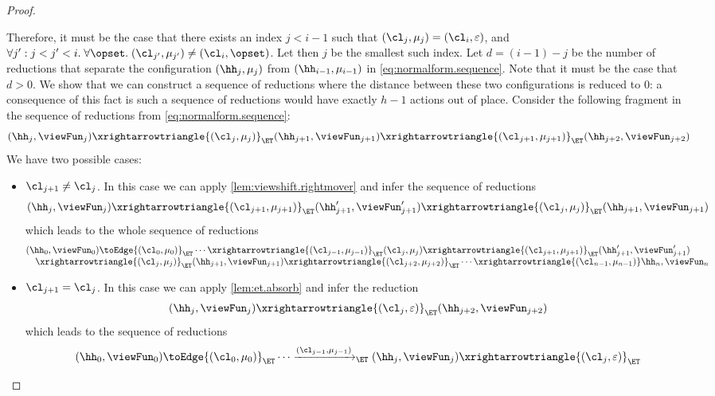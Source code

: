\begin{proof}
\begin{enumerate}
Therefore, it must be the case that there exists an index $j < i-1$ such that $(\cl_{j}, \mu_{j}) = (\cl_{i}, \varepsilon)$, 
and $\forall j': j< j' < i.\;\forall \opset.\;(\cl_{j'}, \mu_{j'}) \neq (\cl_{i}, \opset)$. Let then $j$ be the smallest such index. 
Let $d = (i-1)-j$ be the number of reductions that separate the configuration $(\hh_{j}, \mu_{j})$ from 
$(\hh_{i-1}, \mu_{i-1})$ in \cref{eq:normalform.sequence}. Note that it must be the case that $d > 0$. We show that we can 
construct a sequence of reductions where the distance between these two configurations is reduced to $0$: 
a consequence of this fact is such a sequence of reductions would have exactly $h-1$ actions out of place.
Consider the following fragment in the sequence of reductions from \cref{eq:normalform.sequence}:
\[
(\hh_{j}, \viewFun_{j}) \xrightarrowtriangle{(\cl_{j}, \mu_{j})}_{\ET} (\hh_{j+1}, \viewFun_{j+1}) 
\xrightarrowtriangle{(\cl_{j+1}, \mu_{j+1})}_{\ET} (\hh_{j+2}, \viewFun_{j+2})
\]
We have two possible cases: 
\begin{itemize}
\item $\cl_{j+1} \neq \cl_{j}$. In this case we can apply \cref{lem:viewshift.rightmover} and infer the sequence of 
reductions 
\[
(\hh_{j}, \viewFun_{j}) \xrightarrowtriangle{(\cl_{j+1}, \mu_{j+1})}_{\ET} (\hh_{j+1}', \viewFun_{j+1}') 
\xrightarrowtriangle{(\cl_{j}, \mu_{j})}_{\ET} (\hh_{j+1}, \viewFun_{j+1})
\]
which leads to the whole sequence of reductions 
\[
\begin{array}{@{}l@{}}
(\hh_{0}, \viewFun_{0}) \toEdge{(\cl_{0}, \mu_{0})}_{\ET} \cdots 
\xrightarrowtriangle{(\cl_{j-1}, \mu_{j-1})}_{\ET} (\cl_{j}, \mu_{j}) 
\xrightarrowtriangle{(\cl_{j+1}, \mu_{j+1})}_{\ET} (\hh'_{j+1}, \viewFun'_{j+1})  \\
\quad \xrightarrowtriangle{(\cl_{j}, \mu_{j})}_{\ET} (\hh_{j+1}, \viewFun_{j+1})  
\xrightarrowtriangle{(\cl_{j+2}, \mu_{j+2})}_{\ET} \cdots \xrightarrowtriangle{(\cl_{n-1}, \mu_{n-1})} \hh_{n}, \viewFun_{n}
\end{array}
\]
\item $\cl_{j+1} = \cl_{j}$. In this case we can apply \cref{lem:et.absorb} and infer the reduction 
\[
(\hh_{j}, \viewFun_{j}) \xrightarrowtriangle{(\cl_{j}, \varepsilon)}_{\ET} (\hh_{j+2}, \viewFun_{j+2})
\]
which leads to the sequence of reductions 
\[
\begin{array}{@{}l@{}}
(\hh_{0}, \viewFun_{0}) \toEdge{(\cl_{0}, \mu_{0})}_{\ET} \cdots 
\xrightarrow{(\cl_{j-1}, \mu_{j-1})}_{\ET} (\hh_{j}, \viewFun_{j}) \xrightarrowtriangle{(\cl_{j}, \varepsilon)}_{\ET}  \\

\end{array}\]
\end{itemize}
\end{enumerate}
\end{proof}
